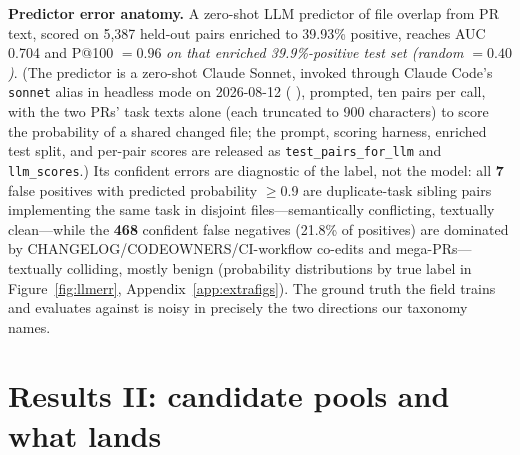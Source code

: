\documentclass{article}
\begin{document}
\textbf{Predictor error anatomy.}
A zero-shot LLM predictor of file overlap from PR text, scored on 5{,}387 held-out pairs enriched to 39.93\% positive, reaches AUC 0.704 and P@100 $=0.96$ \emph{on that enriched 39.9\%-positive test set (random $=0.40$)}. %
(The predictor is a zero-shot Claude Sonnet, invoked through Claude Code's \texttt{sonnet} alias in headless mode on 2026-08-12 (%
), prompted, ten pairs per call, with the two PRs' task texts alone (each truncated to 900 characters) to score the probability of a shared changed file; the prompt, scoring harness, enriched test split, and per-pair scores are released as \texttt{test\_pairs\_for\_llm} and \texttt{llm\_scores}.) %
Its confident errors are diagnostic of the label, not the model: all \textbf{7} false positives with predicted probability $\geq$0.9 are duplicate-task sibling pairs implementing the same task in disjoint files---semantically conflicting, textually clean---while the \textbf{468} confident false negatives (21.8\% of positives) are dominated by CHANGELOG/CODEOWNERS/CI-workflow co-edits and mega-PRs---textually colliding, mostly benign (probability distributions by true label in Figure~\ref{fig:llmerr}, Appendix~\ref{app:extrafigs}). %
The ground truth the field trains and evaluates against is noisy in precisely the two directions our taxonomy names.

\section{Results II: candidate pools and what lands}
\label{sec:pools}
\end{document}
